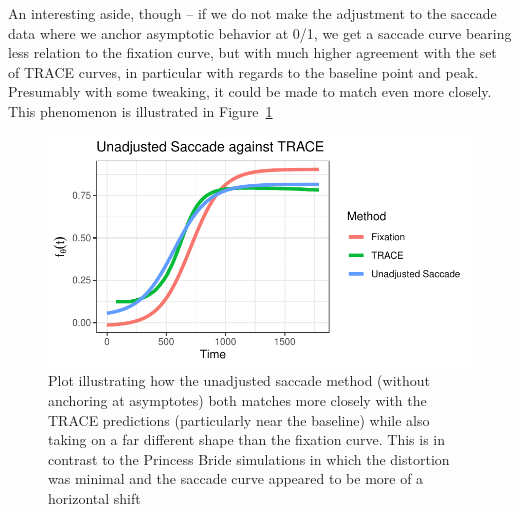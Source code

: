 \documentclass{article}
\begin{document}
An interesting aside, though -- if we do not make the adjustment to the saccade data where we anchor asymptotic behavior at 0/1, we get a saccade curve bearing less relation to the fixation curve, but with much higher agreement with the set of TRACE curves, in particular with regards to the baseline point and peak. Presumably with some tweaking, it could be made to match even more closely. This phenomenon is illustrated in Figure~\ref{fig:unadjusted_saccade_against_trace}

\begin{figure}[H]
  \centering
  \includegraphics{unadjusted_sac_w_trace.pdf}
  \caption{Plot illustrating how the unadjusted saccade method (without anchoring at asymptotes) both matches more closely with the TRACE predictions (particularly near the baseline) while also taking on a far different shape than the fixation curve. This is in contrast to the Princess Bride simulations in which the distortion was minimal and the saccade curve appeared to be more of a horizontal shift}
  \label{fig:unadjusted_saccade_against_trace}
\end{figure}
\end{document}
